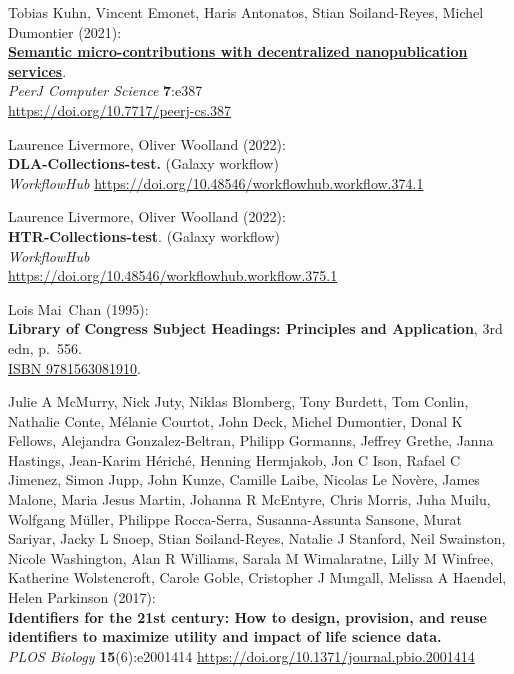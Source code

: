 \begin{thebibliography}{9}
Tobias Kuhn, Vincent Emonet, Haris Antonatos, Stian
Soiland-Reyes, Michel Dumontier (2021):\\
\href{../../../2021/phd/nanopub/}{\textbf{Semantic micro-contributions
with decentralized nanopublication services}}.\\
\emph{PeerJ Computer Science} \textbf{7}:e387\\
\url{https://doi.org/10.7717/peerj-cs.387}

Laurence Livermore, Oliver Woolland (2022):\\
\textbf{DLA-Collections-test.} (Galaxy workflow)\\
\emph{WorkflowHub}
\url{https://doi.org/10.48546/workflowhub.workflow.374.1}

Laurence Livermore, Oliver Woolland (2022):\\
\textbf{HTR-Collections-test}. (Galaxy workflow)\\
\emph{WorkflowHub}\\
\url{https://doi.org/10.48546/workflowhub.workflow.375.1}

Lois Mai~Chan (1995):\\
\textbf{Library of Congress Subject Headings: Principles and
Application}, 3rd edn, p.~556.\\
\href{https://identifiers.org/isbn/9781563081910}{ISBN 9781563081910}.

Julie A McMurry, Nick Juty, Niklas Blomberg, Tony
Burdett, Tom Conlin, Nathalie Conte, Mélanie Courtot, John Deck, Michel
Dumontier, Donal K Fellows, Alejandra Gonzalez-Beltran, Philipp
Gormanns, Jeffrey Grethe, Janna Hastings, Jean-Karim Hériché, Henning
Hermjakob, Jon C Ison, Rafael C Jimenez, Simon Jupp, John Kunze, Camille
Laibe, Nicolas Le Novère, James Malone, Maria Jesus Martin, Johanna R
McEntyre, Chris Morris, Juha Muilu, Wolfgang Müller, Philippe
Rocca-Serra, Susanna-Assunta Sansone, Murat Sariyar, Jacky L Snoep,
Stian Soiland-Reyes, Natalie J Stanford, Neil Swainston, Nicole
Washington, Alan R Williams, Sarala M Wimalaratne, Lilly M Winfree,
Katherine Wolstencroft, Carole Goble, Cristopher J Mungall, Melissa A
Haendel, Helen Parkinson (2017):\\
\textbf{Identifiers for the 21st century: How to design, provision, and
reuse identifiers to maximize utility and impact of life science
data.}\\
\emph{PLOS Biology} \textbf{15}(6):e2001414
\url{https://doi.org/10.1371/journal.pbio.2001414}


\end{thebibliography}
